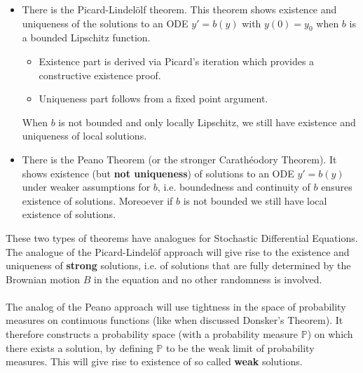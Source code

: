 \documentclass[../mainfile.tex]{subfiles}
\begin{document}
\begin{itemize}
\item There is the Picard-Lindelölf theorem. This theorem shows existence and uniqueness of the solutions to an ODE $y'=b(y)$ with $y(0)=y_0$ when $b$ is a bounded Lipschitz function. 
\begin{itemize}
\item Existence part is derived via Picard's iteration which provides a constructive existence proof.
\item Uniqueness part follows from a fixed point argument.
\end{itemize}
When $b$ is not bounded and only locally Lipschitz, we still have existence and uniqueness of local solutions.
\item There is the Peano Theorem (or the stronger Carathéodory Theorem). It shows existence (but \textbf{not uniqueness}) of solutions to an ODE $y'=b(y)$ under weaker assumptions for $b$, i.e. boundedness and continuity of $b$ ensures existence of solutions. Moreoever if $b$ is not bounded we still have local existence of solutions. 
\end{itemize}
These two types of theorems have analogues for Stochastic Differential Equations. The analogue of the Picard-Lindelöf approach will give rise to the existence and uniqueness of \textbf{strong} solutions, i.e. of solutions that are fully determined by the Brownian motion $B$ in the equation and no other randomness is involved. 
\\\\
The analog of the Peano approach will use tightness in the space of probability measures on continuous functions (like when discussed Donsker's Theorem). It therefore constructs a probability space (with a probability measure $\mathbb{P}$) on which there exists a solution,  by defining $\mathbb{P}$ to be the weak limit of probability measures. This will give rise to existence of so called \textbf{weak} solutions.
\newpage
\end{document}
